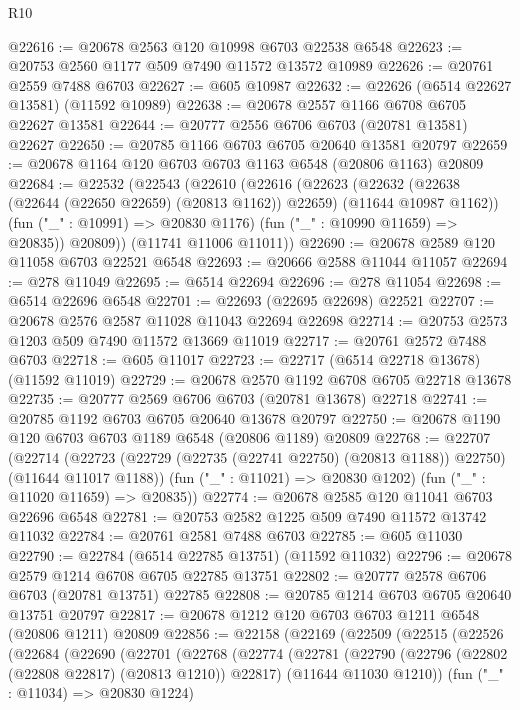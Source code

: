 \begin{lexlean}{R10}
\begin{coremodule}
@22616 := @20678 @2563 @120 @10998 @6703 @22538 @6548
@22623 := @20753 @2560 @1177 @509 @7490 @11572 @13572 @10989
@22626 := @20761 @2559 @7488 @6703
@22627 := @605 @10987
@22632 := @22626 (@6514 @22627 @13581) (@11592 @10989)
@22638 := @20678 @2557 @1166 @6708 @6705 @22627 @13581
@22644 := @20777 @2556 @6706 @6703 (@20781 @13581) @22627
@22650 := @20785 @1166 @6703 @6705 @20640 @13581 @20797
@22659 := @20678 @1164 @120 @6703 @6703 @1163 @6548 (@20806 @1163) @20809
@22684 := @22532
    (@22543
      (@22610
        (@22616
          (@22623
            (@22632 (@22638 (@22644 (@22650 @22659) (@20813 @1162)) @22659) (@11644 @10987 @1162))
            (fun ("_" : @10991) => @20830 @1176)
            (fun ("_" : @10990 @11659) => @20835))
          @20809))
      (@11741 @11006 @11011))
@22690 := @20678 @2589 @120 @11058 @6703 @22521 @6548
@22693 := @20666 @2588 @11044 @11057
@22694 := @278 @11049
@22695 := @6514 @22694
@22696 := @278 @11054
@22698 := @6514 @22696 @6548
@22701 := @22693 (@22695 @22698) @22521
@22707 := @20678 @2576 @2587 @11028 @11043 @22694 @22698
@22714 := @20753 @2573 @1203 @509 @7490 @11572 @13669 @11019
@22717 := @20761 @2572 @7488 @6703
@22718 := @605 @11017
@22723 := @22717 (@6514 @22718 @13678) (@11592 @11019)
@22729 := @20678 @2570 @1192 @6708 @6705 @22718 @13678
@22735 := @20777 @2569 @6706 @6703 (@20781 @13678) @22718
@22741 := @20785 @1192 @6703 @6705 @20640 @13678 @20797
@22750 := @20678 @1190 @120 @6703 @6703 @1189 @6548 (@20806 @1189) @20809
@22768 := @22707
    (@22714
      (@22723 (@22729 (@22735 (@22741 @22750) (@20813 @1188)) @22750) (@11644 @11017 @1188))
      (fun ("_" : @11021) => @20830 @1202)
      (fun ("_" : @11020 @11659) => @20835))
@22774 := @20678 @2585 @120 @11041 @6703 @22696 @6548
@22781 := @20753 @2582 @1225 @509 @7490 @11572 @13742 @11032
@22784 := @20761 @2581 @7488 @6703
@22785 := @605 @11030
@22790 := @22784 (@6514 @22785 @13751) (@11592 @11032)
@22796 := @20678 @2579 @1214 @6708 @6705 @22785 @13751
@22802 := @20777 @2578 @6706 @6703 (@20781 @13751) @22785
@22808 := @20785 @1214 @6703 @6705 @20640 @13751 @20797
@22817 := @20678 @1212 @120 @6703 @6703 @1211 @6548 (@20806 @1211) @20809
@22856 := @22158
    (@22169
      (@22509
        (@22515
          (@22526
            (@22684
              (@22690
                (@22701
                  (@22768
                    (@22774
                      (@22781
                        (@22790
                          (@22796 (@22802 (@22808 @22817) (@20813 @1210)) @22817)
                          (@11644 @11030 @1210))
                        (fun ("_" : @11034) => @20830 @1224)

\end{coremodule}
\end{lexlean}
